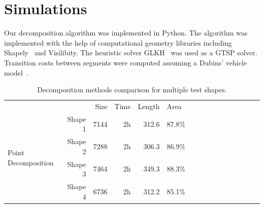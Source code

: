 \documentclass[../main.tex]{subfiles}
\begin{document}
\section{Simulations}
\label{section:multi_simulations}

Our decomposition algorithm was implemented in Python. The algorithm was implemented with the help of computational geometry libraries including Shapely~\cite{Shapely:13} and Visilibity\cite{VisiLibity:08}. The heuristic solver GLKH~\cite{helsgaun2000effective} was used as a GTSP solver. Transition costs between segments were computed assuming a Dubins' vehicle model~\cite{dubins1957curves}.



\begin{table}
	\centering
	\caption{Decomposition methods comparison for multiple test shapes.}
	\label{table:performance}
	\begin{tabular}{@{} l rrrr l rrrr l rrrr l@{}}
		\toprule
		&& Size & Time & Length & Area \\
		\cmidrule{3-6}
		\multirow{4}{*}{Point Decomposition} & Shape 1 & 7144 & 2h & 312.6 & 87.8\%\\
		& Shape 2 & 7288  & 2h & 306.3 & 86.9\%\\
		& Shape 3 & 7464 & 2h & 349.3 & 88.3\%\\
		& Shape 4 & 6736 & 2h & 312.2 & 85.1\%\\
		\bottomrule

	\end{tabular}
\end{table}
\end{document}
